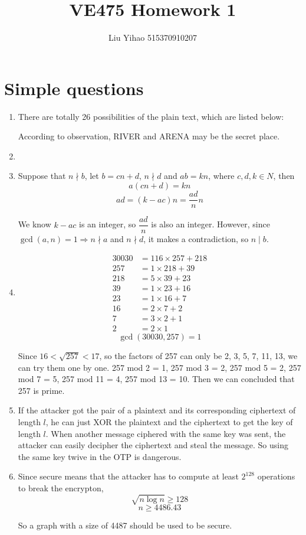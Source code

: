 \documentclass{article}
\title{VE475 Homework 1}
\author{Liu Yihao 515370910207}
\date{}
\begin{document}
\maketitle

\section{Simple questions}
\begin{enumerate}
\item
There are totally 26 possibilities of the plain text, which are listed below:



According to observation, RIVER and ARENA may be the secret place.

\item


\item
Suppose that $n\nmid b$, let $b=cn+d$, $n\nmid d$ and $ab=kn$, where $c,d,k\in N$, then
$$a(cn+d)=kn$$
$$ad=(k-ac)n=\frac{ad}{n}n$$

We know $k-ac$ is an integer, so $\dfrac{ad}{n}$ is also an integer. However, since $\gcd(a,n)=1\Rightarrow n\nmid a$ and $n\nmid d$, it makes a contradiction, so $n\mid b$.

\item
\begin{align*}
30030&=116\times257+218\\
257&=1\times218+39\\
218&=5\times39+23\\
39&=1\times23+16\\
23&=1\times16+7\\
16&=2\times7+2\\
7&=3\times2+1\\
2&=2\times1
\end{align*}
$$\gcd(30030,257)=1$$

Since $16<\sqrt{257}<17$, so the factors of 257 can only be 2, 3, 5, 7, 11, 13, we can try them one by one. 257 mod 2 = 1, 257 mod 3 = 2, 257 mod 5 = 2, 257 mod 7 = 5, 257 mod 11 = 4, 257 mod 13 = 10. Then we can concluded that 257 is prime.

\item
If the attacker got the pair of a plaintext and its corresponding ciphertext of length $l$, he can just XOR the plaintext and the ciphertext to get the key of length $l$. When another message ciphered with the same key was sent, the attacker can easily decipher the ciphertext and steal the message. So using the same key twive in the OTP is dangerous.

\item
Since secure means that the attacker has to compute at least $2^{128}$ operations to break the encrypton, $$\sqrt{n\log n}\geqslant 128$$
$$n\geqslant4486.43$$

So  a graph with a size of 4487 should be used to be secure.

\end{enumerate}
\end{document}
